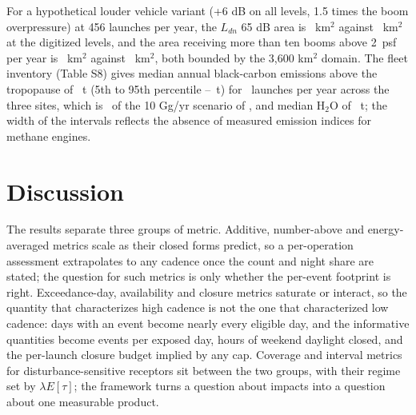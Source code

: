 \documentclass[preprint,12pt,authoryear]{elsarticle}
\begin{document}
For a hypothetical louder vehicle variant (+6 dB on all levels, 1.5 times the boom overpressure) at 456 launches per year, the $L_{dn}$ 65 dB area is \valESevenNFourFiveSixOffSixBsOneFiveLdnSixFiveArea~km$^2$ against \valESevenNFourFiveSixOffZeroBsOneZeroLdnSixFiveArea~km$^2$ at the digitized levels, and the area receiving more than ten booms above 2~psf per year is \valESevenNFourFiveSixOffSixBsOneFiveBoomTwoArea~km$^2$ against \valESevenNFourFiveSixOffZeroBsOneZeroBoomTwoArea~km$^2$, both bounded by the 3,600 km$^2$ domain. The fleet inventory (Table S8) gives median annual black-carbon emissions above the tropopause of \valEEightFleetTotalBcMedianT~t (5th to 95th percentile \valEEightFleetTotalBcPZeroFiveT--\valEEightFleetTotalBcPNineFiveT~t) for \valEEightFleetLaunches~launches per year across the three sites, which is \valEEightBcFleetOverOneZeroGgMedian~of the 10 Gg/yr scenario of \citet{maloney2022}, and median H$_2$O of \valEEightFleetTotalHTwoOMedianT~t; the width of the intervals reflects the absence of measured emission indices for methane engines.

\section{Discussion}
\label{sec:discussion}

The results separate three groups of metric. Additive, number-above and energy-averaged metrics scale as their closed forms predict, so a per-operation assessment extrapolates to any cadence once the count and night share are stated; the question for such metrics is only whether the per-event footprint is right. Exceedance-day, availability and closure metrics saturate or interact, so the quantity that characterizes high cadence is not the one that characterized low cadence: days with an event become nearly every eligible day, and the informative quantities become events per exposed day, hours of weekend daylight closed, and the per-launch closure budget implied by any cap. Coverage and interval metrics for disturbance-sensitive receptors sit between the two groups, with their regime set by $\lambda E[\tau]$; the framework turns a question about impacts into a question about one measurable product.
\end{document}
